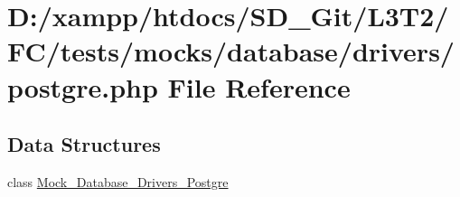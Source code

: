 \hypertarget{postgre_8php}{}\section{D\+:/xampp/htdocs/\+S\+D\+\_\+\+Git/\+L3\+T2/\+F\+C/tests/mocks/database/drivers/postgre.php File Reference}
\label{postgre_8php}
\subsection*{Data Structures}
\begin{DoxyCompactItemize}
\item 
class \hyperlink{class_mock___database___drivers___postgre}{Mock\+\_\+\+Database\+\_\+\+Drivers\+\_\+\+Postgre}
\end{DoxyCompactItemize}
